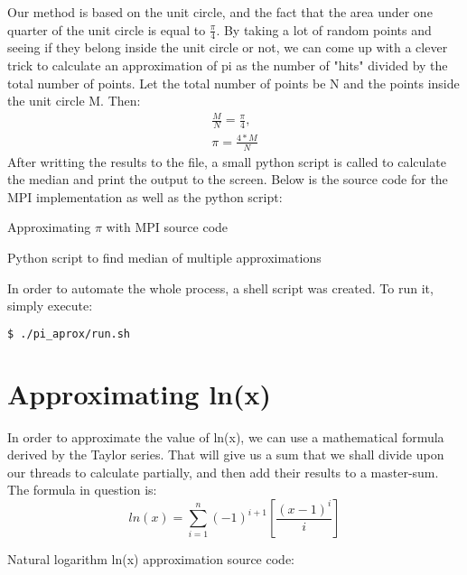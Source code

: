 \documentclass{article}
\begin{document}
Our method is based on the unit circle, and the fact that the area under one quarter of the unit circle is equal to $ \frac{\pi}{4} $. By taking a lot of random points and seeing if they belong inside the unit circle or not, we can come up with a clever trick to calculate an approximation of pi as the number of "hits" divided by the total number of points.
Let the total number of points be N and the points inside the unit circle M. Then:
\begin{align}
	\frac{M}{N} = \frac{\pi}{4},\\
	\pi = \frac{4 * M}{N}
\end{align}
After writting the results to the file, a small python script is called to calculate the median and print the output to the screen. Below is the source code for the MPI implementation as well as the python script:
\newpage
\begin{center}
	Approximating $ \pi $ with MPI source code
\end{center}

\newpage
\begin{center}
	Python script to find median of multiple approximations
\end{center}


In order to automate the whole process, a shell script was created. To run it, simply execute:
\begin{lstlisting}[language=bash]
	$ ./pi_aprox/run.sh
\end{lstlisting}



\section{Approximating ln(x)}

In order to approximate the value of ln(x), we can use a mathematical formula derived by the Taylor series.
That will give us a sum that we shall divide upon our threads to calculate partially, and then add their results to a master-sum.
The formula in question is:
\begin{equation}
	ln(x) = \sum_{i=1}^{n}(-1)^{i+1}[\frac{(x-1)^i}{i}]
\end{equation}
\newline
\begin{center}
	Natural logarithm ln(x) approximation source code:
\end{center}
\end{document}
